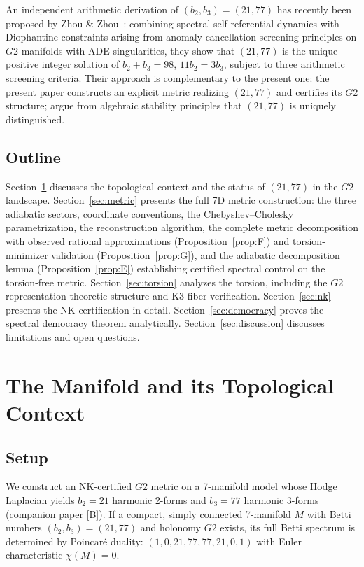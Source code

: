 \documentclass[11pt,a4paper]{article}
\theoremstyle{definition}
\theoremstyle{remark}
\newcommand{\Gtwo}{\mathrm{G}_2}
\def\Gtwo{G2}%
\begin{document}
An independent arithmetic derivation of $(b_2, b_3) = (21, 77)$ has recently been proposed by Zhou \& Zhou~\cite{ZhouZhouA2026,ZhouZhouE2026}: combining spectral self-referential dynamics with Diophantine constraints arising from anomaly-cancellation screening principles on $\Gtwo$ manifolds with ADE singularities, they show that $(21, 77)$ is the unique positive integer solution of $b_2 + b_3 = 98$, $11 b_2 = 3 b_3$, subject to three arithmetic screening criteria. Their approach is complementary to the present one: the present paper constructs an explicit metric realizing $(21, 77)$ and certifies its $\Gtwo$ structure; \cite{ZhouZhouA2026,ZhouZhouE2026} argue from algebraic stability principles that $(21, 77)$ is uniquely distinguished.

\subsection{Outline}

Section~\ref{sec:manifold} discusses the topological context and the status of $(21, 77)$ in the $\Gtwo$ landscape. Section~\ref{sec:metric} presents the full 7D metric construction: the three adiabatic sectors, coordinate conventions, the Chebyshev--Cholesky parametrization, the reconstruction algorithm, the complete metric decomposition with observed rational approximations (Proposition~\ref{prop:F}) and torsion-minimizer validation (Proposition~\ref{prop:G}), and the adiabatic decomposition lemma (Proposition~\ref{prop:E}) establishing certified spectral control on the torsion-free metric. Section~\ref{sec:torsion} analyzes the torsion, including the $\Gtwo$ representation-theoretic structure and K3 fiber verification. Section~\ref{sec:nk} presents the NK certification in detail. Section~\ref{sec:democracy} proves the spectral democracy theorem analytically. Section~\ref{sec:discussion} discusses limitations and open questions.

\section{The Manifold and its Topological Context}\label{sec:manifold}

\subsection{Setup}

We construct an NK-certified $\Gtwo$ metric on a 7-manifold model whose Hodge Laplacian yields $b_2 = 21$ harmonic 2-forms and $b_3 = 77$ harmonic 3-forms (companion paper [B]). If a compact, simply connected 7-manifold $M$ with Betti numbers $(b_2, b_3) = (21, 77)$ and holonomy $\Gtwo$ exists, its full Betti spectrum is determined by Poincar\'e duality: $(1, 0, 21, 77, 77, 21, 0, 1)$ with Euler characteristic $\chi(M) = 0$.
\end{document}
